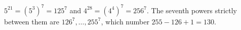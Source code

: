 $5^{21}=\left(5^3\right)^7=125^7$ and $4^{28}=\left(4^4\right)^7=256^7$. The seventh powers strictly between them are $126^7,\dots,255^7$, which number $255-126+1=\boxed{130}$.
